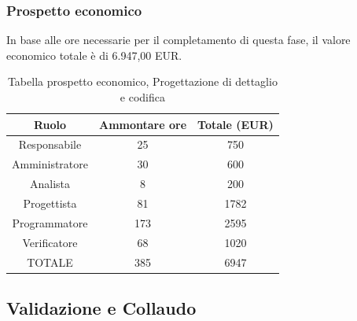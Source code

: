 \subsubsection{Prospetto economico}
In base alle ore necessarie per il completamento di questa fase, il valore economico totale è di 6.947,00 EUR.
\begin{table}[h]
\caption{Tabella prospetto economico, Progettazione di dettaglio e codifica}  
\begin{center}
\begin{tabular}{ |c|c|c|  }
 \hline
 Ruolo 		& Ammontare ore 	& Totale (EUR)\\
 	\hline
 \hline
 	Responsabile	& 25 		& 750\\
	Amministratore	& 30		& 600\\
	Analista		& 8 	& 200\\
	Progettista		& 81		& 1782\\
	Programmatore	& 173		&2595 \\
	Verificatore	& 68 	& 1020\\
 \hline\hline
 TOTALE		& 385		& 6947\\
  \hline
\end{tabular}
\end{center}
\end{table}
\newpage
\subsection{Validazione e Collaudo}
